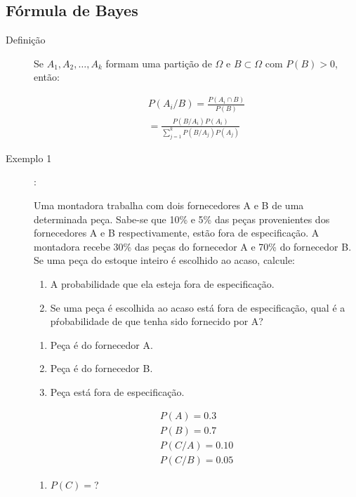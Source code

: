    \subsection{Fórmula de Bayes}
   \begin{description}
     \item [Definição] Se $A_1,A_2,\ldots, A_k$ formam uma partição de $\Omega$ e 
       $B \subset \Omega$ com $P(B)>0$, então:

       \begin{align}
         P(A_i/ B)= \frac{P(A_i \cap B)}{P(B)}\\ \nonumber
         =\frac{P(B/A_i)P(A_i)}{\sum \limits_{j=1}^k P(B/A_j)P(A_j)}
       \end{align}

     \item [Exemplo 1]: 

       Uma montadora trabalha com dois fornecedores A e B de uma determinada peça.
       Sabe-se que 10\% e 5\% das peças provenientes dos fornecedores A e B respectivamente,
       estão fora de especificação. A montadora recebe 30\% das peças do fornecedor A e 70\%
       do fornecedor B. Se uma peça do estoque inteiro é escolhido ao acaso, calcule:

       \begin{enumerate}[label=(\alph*)]
         \item A probabilidade que ela esteja fora de especificação.
         \item Se uma peça é escolhida ao acaso está fora de especificação, qual é a 
           pŕobabilidade de que tenha sido fornecido por A?
       \end{enumerate}
       \begin{enumerate}[label=\Alph*:]
         \item  Peça é do fornecedor A.
         \item  Peça é do fornecedor B.
         \item  Peça está fora de especificação.
       \end{enumerate}
       \begin{align*}
         P(A)= 0.3\\
         P(B)=0.7\\
         P(C/A)= 0.10\\
         P(C/B)= 0.05
       \end{align*}
       \begin{enumerate}[label=(\alph*)]
         \item $P(C)=$?


\end{enumerate}
\end{description}
